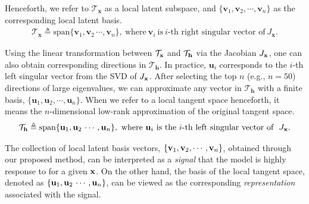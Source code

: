 {Henceforth, we refer to $\mathcal{T}_{\mathbf{x}}$ as a local latent subspace, and $\{\mathbf{v}_1, \mathbf{v}_2, \cdots, \mathbf{v}_n \}$ as the corresponding local latent basis.}
\begin{align}
    \mathcal{T}_{\mathbf{x}} \triangleq \text{span} \{\mathbf{v}_1, \mathbf{v}_2\, \cdots, \mathbf{v}_n\},~\text{where}~\mathbf{v}_i~\text{is}~i\text{-th right singular vector of}~J_{\mathbf{x}}.
\end{align}

Using the linear transformation between $\mathcal{T}_\mathbf{x}{}$ and $\mathcal{T}_\mathbf{h}{}$ via the Jacobian ${J}_{\mathbf{x}}{}$, one can also obtain corresponding directions in $\mathcal{T}_{\mathbf{h}}$.
In practice, $\mathbf{u}_i$ corresponds to the $i$-th left singular vector from the {SVD} of ${J}_{\mathbf{x}}{}$.
After selecting the top $n$ (e.g., $n = 50$) directions of large eigenvalues, we can approximate any vector in $\mathcal{T}_{\mathbf{h}}$ with {a} finite basis, $\{\mathbf{u}_1, \mathbf{u}_2, \cdots, \mathbf{u}_n \}$.
When we refer to a local tangent space henceforth, it means the $n$-dimensional low-rank approximation of the original tangent space.
\begin{align} \label{eq:local_tangent_space}
    \mathcal{T}_{\mathbf{h}} \triangleq \text{span} \{\mathbf{u}_1, \mathbf{u}_2\, \cdots, \mathbf{u}_n\},~\text{where}~\mathbf{u}_i~\text{is the}~i\text{-th left singular vector of }~J_{\mathbf{x}}.
\end{align}

{The collection of local latent basis vectors, $\{\mathbf{v}_1, \mathbf{v}_2, \cdots, \mathbf{v}_n\}$, obtained through our proposed method, can be interpreted as a {\it signal} that the model is highly response to for a given $\mathbf{x}$.
On the other hand, the basis of the local tangent space, denoted as $\{\mathbf{u}_1, \mathbf{u}_2\, \cdots, \mathbf{u}_n\}$, can be viewed as the corresponding {\it representation} associated with the signal.
}

